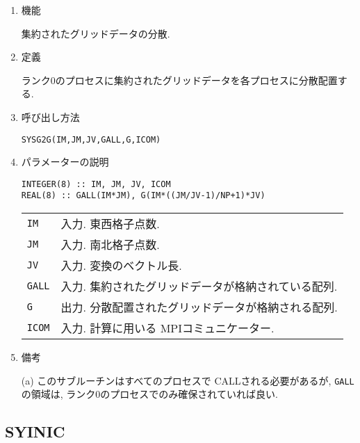 \documentclass[a4j]{jsarticle}
\begin{document}
\begin{enumerate}

\item 機能 

集約されたグリッドデータの分散.

\item 定義

ランク0のプロセスに集約されたグリッドデータを各プロセスに分散配置する.

\item 呼び出し方法 

\texttt{SYSG2G(IM,JM,JV,GALL,G,ICOM)}
  
\item パラメーターの説明

\begin{verbatim}        
INTEGER(8) :: IM, JM, JV, ICOM
REAL(8) :: GALL(IM*JM), G(IM*((JM/JV-1)/NP+1)*JV)
\end{verbatim}      

\begin{tabular}{ll}
\texttt{IM} & 入力. 東西格子点数.\\
\texttt{JM} & 入力. 南北格子点数.\\
\texttt{JV} & 入力. 変換のベクトル長.\\
\texttt{GALL} 
 &  入力. 集約されたグリッドデータが格納されている配列.\\
\texttt{G} 
& 出力. 分散配置されたグリッドデータが格納される配列.\\
\texttt{ICOM} & 入力. 計算に用いる MPIコミュニケーター.
\end{tabular}

\item 備考

(a) このサブルーチンはすべてのプロセスで CALLされる必要があるが,
\texttt{GALL}の領域は, ランク0のプロセスでのみ確保されていれば良い.

\end{enumerate}


\subsection{SYINIC}
\end{document}
